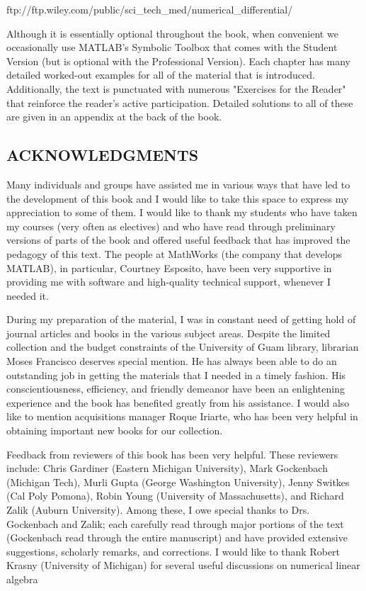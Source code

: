 \documentclass{book}
\begin{document}
{\selectfont ftp://ftp.wiley.com/public/sci\_tech\_med/numerical\_differential/  }

\noindent Although it is essentially optional throughout the book, when convenient we
occasionally use MATLAB's Symbolic Toolbox that comes with the Student Version (but is optional with the Professional Version). Each chapter has many
detailed worked-out examples for all of the material that is introduced.
Additionally, the text is punctuated with numerous "Exercises for the Reader" that
reinforce the reader's active participation. Detailed solutions to all of these are
given in an appendix at the back of the book.

\subsection*{ACKNOWLEDGMENTS}

Many individuals and groups have assisted me in various ways that have led to the
development of this book and I would like to take this space to express my
appreciation to some of them. I would like to thank my students who have taken
my courses (very often as electives) and who have read through preliminary
versions of parts of the book and offered useful feedback that has improved the
pedagogy of this text. The people at MathWorks (the company that develops
MATLAB), in particular, Courtney Esposito, have been very supportive in
providing me with software and high-quality technical support, whenever I needed
it.

During my preparation of the material, I was in constant need of getting hold of
journal articles and books in the various subject areas. Despite the limited
collection and the budget constraints of the University of Guam library, librarian
Moses Francisco deserves special mention. He has always been able to do an
outstanding job in getting the materials that I needed in a timely fashion. His
conscientiousness, efficiency, and friendly demeanor have been an enlightening
experience and the book has benefited greatly from his assistance. I would also
like to mention acquisitions manager Roque Iriarte, who has been very helpful in
obtaining important new books for our collection.

Feedback from reviewers of this book has been very helpful. These reviewers
include: Chris Gardiner (Eastern Michigan University), Mark Gockenbach
(Michigan Tech), Murli Gupta (George Washington University), Jenny Switkes
(Cal Poly Pomona), Robin Young (University of Massachusetts), and Richard
Zalik (Auburn University). Among these, I owe special thanks to Drs.
Gockenbach and Zalik; each carefully read through major portions of the text
(Gockenbach read through the entire manuscript) and have provided extensive
suggestions, scholarly remarks, and corrections. I would like to thank Robert
Krasny (University of Michigan) for several useful discussions on numerical linear
algebra
\end{document}
